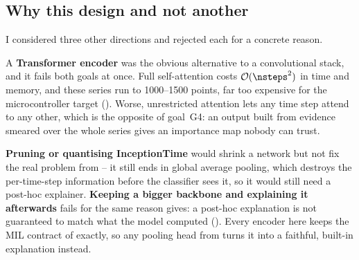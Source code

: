 
\subsection{Why this design and not another}
\label{sec:arch:why}

I considered three other directions and rejected each for a concrete reason.

A \textbf{Transformer encoder} was the obvious alternative to a convolutional stack, and it fails
both goals at once. Full self-attention costs $\mathcal{O}(\nsteps^2)$ in time and memory, and these
series run to 1000--1500 points, far too expensive for the microcontroller target
(). Worse, unrestricted attention lets any time step attend to any other, which is
the opposite of goal~G4: an output built from evidence smeared over the whole series gives an
importance map nobody can trust.

\textbf{Pruning or quantising InceptionTime} would shrink a network but not fix the real problem
from  -- it still ends in global average pooling, which destroys the per-time-step
information before the classifier sees it, so it would still need a post-hoc explainer.
\textbf{Keeping a bigger backbone and explaining it afterwards} fails for the same reason \millet{}
gives: a post-hoc explanation is not guaranteed to match what the model computed
(). Every encoder here keeps the MIL contract of 
exactly, so any pooling head from  turns it into a faithful, built-in explanation
instead.
